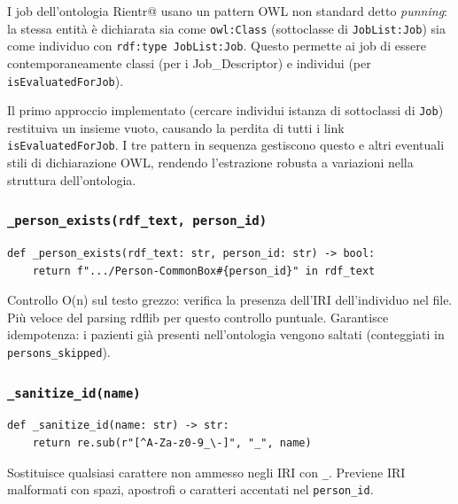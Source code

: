 \documentclass[a4paper,12pt]{article}
\begin{document}
\noindent \begin{infobox}
I job dell'ontologia Rientr@ usano un pattern OWL non standard detto
\textit{punning}: la stessa entit\`{a} \`{e} dichiarata sia come
\texttt{owl:Class} (sottoclasse di \texttt{JobList:Job}) sia come
individuo con \texttt{rdf:type JobList:Job}. Questo permette ai job di
essere contemporaneamente classi (per i Job\_Descriptor) e individui
(per \texttt{isEvaluatedForJob}).

Il primo approccio implementato (cercare individui istanza di sottoclassi
di \texttt{Job}) restituiva un insieme vuoto, causando la perdita di tutti
i link \texttt{isEvaluatedForJob}. I tre pattern in sequenza gestiscono
questo e altri eventuali stili di dichiarazione OWL, rendendo l'estrazione
robusta a variazioni nella struttura dell'ontologia.
\end{infobox}

\subsubsection{\texttt{\_\allowbreak{}person\_\allowbreak{}exists(rdf\_\allowbreak{}text, person\_\allowbreak{}id)}}

\begin{lstlisting}[caption={Controllo esistenza persona con ricerca stringa.}]
def _person_exists(rdf_text: str, person_id: str) -> bool:
    return f".../Person-CommonBox#{person_id}" in rdf_text
\end{lstlisting}

\noindent Controllo O(n) sul testo grezzo: verifica la presenza dell'IRI
dell'individuo nel file. Pi\`{u} veloce del parsing rdflib per questo
controllo puntuale. Garantisce idempotenza: i pazienti gi\`{a} presenti
nell'ontologia vengono saltati (conteggiati in \texttt{persons\_skipped}).

\subsubsection{\texttt{\_sanitize\_id(name)}}

\begin{lstlisting}[caption={Sanificazione dell'ID per IRI validi.}]
def _sanitize_id(name: str) -> str:
    return re.sub(r"[^A-Za-z0-9_\-]", "_", name)
\end{lstlisting}

\noindent Sostituisce qualsiasi carattere non ammesso negli IRI con \texttt{\_}.
Previene IRI malformati con spazi, apostrofi o caratteri accentati nel
\texttt{person\_id}.
\end{document}
